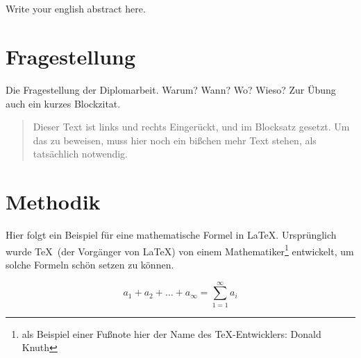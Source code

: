 \documentclass[12pt,pagesize,twoside,DIV=12,headsepline=0.4pt]{scrbook}
\begin{document}
\section*{\huge \abstractname} 	%
\vspace{1.3em} 					%

Write your english abstract here.



\chapter{Fragestellung}
\label{ch:fragestellung} %

Die Fragestellung der Diplomarbeit. Warum? Wann? Wo? Wieso?
Zur Übung auch ein kurzes Blockzitat.

\begin{quote}
Dieser Text ist links und rechts Eingerückt, und im Blocksatz gesetzt. Um das zu beweisen, muss hier noch ein bißchen mehr Text stehen, als tatsächlich notwendig.
\end{quote}


\chapter{Methodik}
\label{ch:methodik}	%

Hier folgt ein Beispiel für eine mathematische Formel in \LaTeX. Ursprünglich wurde \TeX\ (der Vorgänger von \LaTeX) von einem Mathematiker\footnote{als Beispiel einer Fußnote hier der Name des \TeX-Entwicklers: Donald Knuth} entwickelt, um solche Formeln schön setzen zu können.

\begin{displaymath}
a_{1} + a_{2} + \ldots + a_{\infty} = \sum_{1=1}^{\infty}a_{i}
\end{displaymath}


\end{document}

